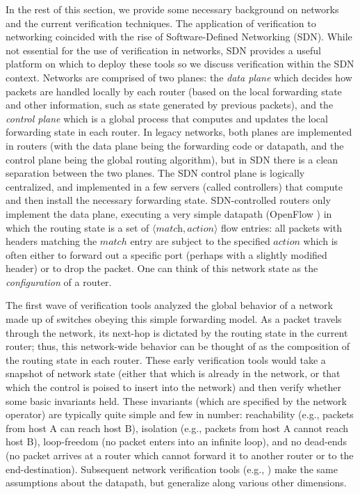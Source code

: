 In the rest of this section, we provide some necessary background on networks and the current verification techniques. The application of verification to networking coincided with the rise of Software-Defined Networking (SDN). While not essential for the use of verification in networks, SDN provides a useful platform on which to deploy these tools so we discuss verification within the SDN context. Networks are comprised of two planes: the {\em data plane} which decides how packets are handled locally by each router (based on the local forwarding state and other information, such as state generated by previous packets), and the {\em control plane} which is a global process that computes and updates the local forwarding state in each router. In legacy networks, both planes are implemented in routers (with the data plane being the forwarding code or datapath, and the control plane being the global routing algorithm), but in SDN there is a clean separation between the two planes. The SDN control plane is logically centralized, and implemented in a few servers (called controllers) that compute and then install the necessary forwarding state. SDN-controlled routers only implement the data plane, executing a very simple datapath (OpenFlow \cite{openflow}) in which the routing state is a set of
$\langle \textit{match}, \textit{action} \rangle$ flow entries: all packets with headers matching the $match$ entry are subject to the specified $action$ which is often either to forward out a specific port (perhaps with a slightly modified header) or to drop the packet.
One can think of this network state as the {\em configuration} of a router.

The first wave of verification tools \cite{anteater,khurshid2012veriflow,oldhsa,kazemian2013real} analyzed the global behavior of a network made up of switches obeying this simple forwarding model. As a packet travels through the network, its next-hop is dictated by the routing state in the current router; thus, this network-wide behavior can be thought of as the composition of the routing state in each router. These early verification tools would take a snapshot of network state (either that which is already in the network, or that which the control is poised to insert into the network) and then verify whether some basic invariants held. These invariants (which are specified by the network operator) are typically quite simple and few in number: reachability (e.g., packets from host A can reach host B), isolation (e.g., packets from host A cannot reach host B), loop-freedom (no packet enters into an infinite loop), and no dead-ends (no packet arrives at a router which cannot forward it to another router or to the end-destination). Subsequent network verification tools (e.g., \cite{guha2013machine,anderson2014netkat,flowlog}) make the same assumptions about the datapath, but generalize along various other dimensions.

